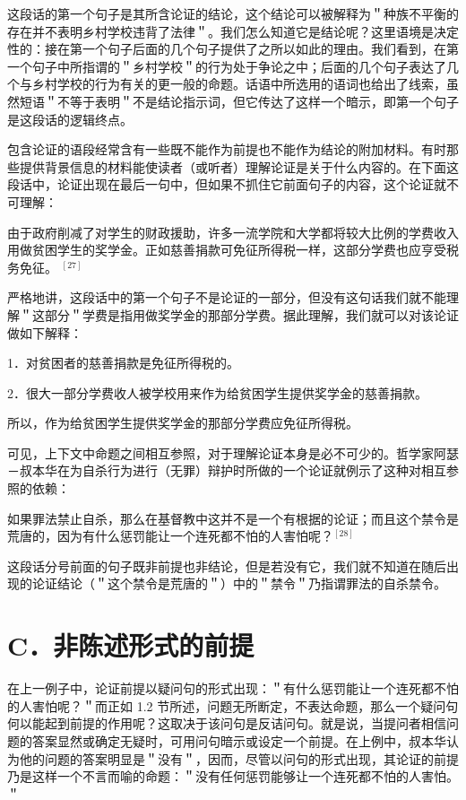 这段话的第一个句子是其所含论证的结论，这个结论可以被解释为＂种族不平衡的存在并不表明乡村学校违背了法律＂。我们怎么知道它是结论呢？这里语境是决定性的：接在第一个句子后面的几个句子提供了之所以如此的理由。我们看到，在第一个句子中所指谓的＂乡村学校＂的行为处于争论之中；后面的几个句子表达了几个与乡村学校的行为有关的更一般的命题。话语中所选用的语词也给出了线索，虽然短语＂不等于表明＂不是结论指示词，但它传达了这样一个暗示，即第一个句子是这段话的逻辑终点。

包含论证的语段经常含有一些既不能作为前提也不能作为结论的附加材料。有时那些提供背景信息的材料能使读者（或听者）理解论证是关于什么内容的。在下面这段话中，论证出现在最后一句中，但如果不抓住它前面句子的内容，这个论证就不可理解：

由于政府削减了对学生的财政援助，许多一流学院和大学都将较大比例的学费收入用做贫困学生的奖学金。正如慈善捐款可免征所得税一样，这部分学费也应亨受税务免征。 ${ }^{[27]}$

严格地讲，这段话中的第一个句子不是论证的一部分，但没有这句话我们就不能理解＂这部分＂学费是指用做奖学金的那部分学费。据此理解，我们就可以对该论证做如下解释：

1．对贫困者的慈善捐款是免征所得税的。

2．很大一部分学费收人被学校用来作为给贫困学生提供奖学金的慈善捐款。

所以，作为给贫困学生提供奖学金的那部分学费应免征所得税。

可见，上下文中命题之间相互参照，对于理解论证本身是必不可少的。哲学家阿瑟－叔本华在为自杀行为进行（无罪）辩护时所做的一个论证就例示了这种对相互参照的依赖：

\begin{displayquote}
如果罪法禁止自杀，那么在基督教中这并不是一个有根据的论证；而且这个禁令是荒唐的，因为有什么惩罚能让一个连死都不怕的人害怕呢？${ }^{[28]}$
\end{displayquote}

这段话分号前面的句子既非前提也非结论，但是若没有它，我们就不知道在随后出现的论证结论（＂这个禁令是荒唐的＂）中的＂禁令＂乃指谓罪法的自杀禁令。

\section*{C．非陈述形式的前提}
在上一例子中，论证前提以疑问句的形式出现：＂有什么惩罚能让一个连死都不怕的人害怕呢？＂而正如 1.2 节所述，问题无所断定，不表达命题，那么一个疑问句何以能起到前提的作用呢？这取决于该问句是反诘问句。就是说，当提问者相信问题的答案显然或确定无疑时，可用问句暗示或设定一个前提。在上例中，叔本华认为他的问题的答案明显是＂没有＂，因而，尽管以问句的形式出现，其论证的前提乃是这样一个不言而喻的命题：＂没有任何惩罚能够让一个连死都不怕的人害怕。＂

